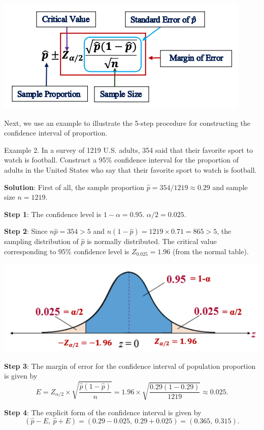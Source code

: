 \documentclass[
]{book}
\begin{document}
\begin{center}\includegraphics[width=0.6\linewidth]{week07/ciPropotionFormula} \end{center}

Next, we use an example to illustrate the 5-step procedure for constructing the confidence interval of proportion.

Example 2. In a survey of 1219 U.S. adults, 354 said that their favorite sport to watch is football. Construct a 95\% confidence interval for the proportion of adults in the United States who say that their favorite sport to watch is football.

\textbf{Solution}: First of all, the sample proportion \(\hat{p} = 354/1219 \approx 0.29\) and sample size \(n = 1219\).

\textbf{Step 1}: The confidence level is \(1 - \alpha = 0.95\). \(\alpha/2 = 0.025\).

\textbf{Step 2}: Since \(n\hat{p} = 354 > 5\) and \(n(1-\hat{p}) = 1219 \times 0.71 = 865 > 5\), the sampling distribution of \(\hat{p}\) is normally distributed. The critical value corresponding to 95\% confidence level is \(Z_{0.025} = 1.96\) (from the normal table).

\begin{center}\includegraphics[width=0.6\linewidth]{week07/example01CV} \end{center}

\textbf{Step 3}: The margin of error for the confidence interval of population proportion is given by
\[
E = Z_{\alpha/2}\times\sqrt{\frac{\hat{p}(1-\hat{p})}{n}} = 1.96\times \sqrt{\frac{0.29(1-0.29)}{1219}} \approx 0.025.
\]

\textbf{Step 4}: The explicit form of the confidence interval is given by
\[
(\hat{p} - E, \ \hat{p} + E) = (0.29 - 0.025, \ 0.29 + 0.025) = (0.365, \ 0.315).
\]
\end{document}

